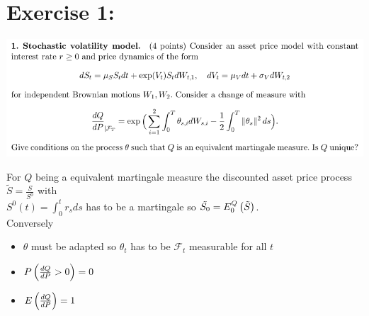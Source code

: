 \documentclass[document.tex]{subfiles}
\begin{document}
\section*{Exercise 1:}

\includegraphics[width=\textwidth]{ex1.png}

For $Q$ being a equivalent martingale measure the discounted asset price process $\tilde{S} = \frac{S}{S^0}$ with \\ 
$S^0 (t) = \int_0^t r_s ds $  has to be a martingale so $\tilde{S_0}= E^Q_0 \left( \tilde{S} \right)$.\\
Conversely 
\begin{itemize}
	\item $\theta$ must be adapted so $\theta_t$ has to be  $\mathcal{F}_t$ measurable for all $t$ \\ 
	\item $P \left( \frac{dQ}{dP} > 0 \right) =0 $
	\item $E \left( \frac{dQ}{dP} \right) = 1$  
\end{itemize}
\end{document}
